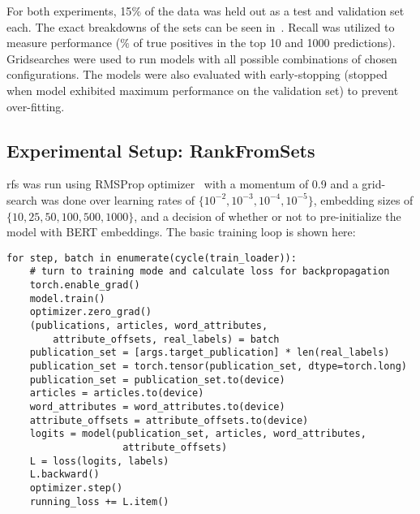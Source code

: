 For both experiments, 15$\%$ of the data was held out as a test and validation set each. The exact breakdowns of the sets can be seen in~. Recall was utilized to measure performance ($\%$ of true positives in the top 10 and 1000 predictions). Gridsearches were used to run models with all possible combinations of chosen configurations. The models were also evaluated with early-stopping (stopped when model exhibited maximum performance on the validation set) to prevent over-fitting.

\subsection{Experimental Setup: RankFromSets}
\acrshort{rfs} was run using RMSProp optimizer~\parencite{tieleman2012lecture} with a momentum of 0.9 and a grid-search was done over learning rates of $\{10^{-2}, 10^{-3}, 10^{-4}, 10^{-5}\}$, embedding sizes of $\{10, 25, 50, 100, 500, 1000\}$, and a decision of whether or not to pre-initialize the model with BERT embeddings. The basic training loop is shown here:
\begin{verbatim}
for step, batch in enumerate(cycle(train_loader)):
    # turn to training mode and calculate loss for backpropagation
    torch.enable_grad()
    model.train()
    optimizer.zero_grad()
    (publications, articles, word_attributes, 
        attribute_offsets, real_labels) = batch
    publication_set = [args.target_publication] * len(real_labels)
    publication_set = torch.tensor(publication_set, dtype=torch.long)
    publication_set = publication_set.to(device)
    articles = articles.to(device)
    word_attributes = word_attributes.to(device)
    attribute_offsets = attribute_offsets.to(device)
    logits = model(publication_set, articles, word_attributes, 
                    attribute_offsets)
    L = loss(logits, labels)
    L.backward()
    optimizer.step()
    running_loss += L.item()
\end{verbatim}

